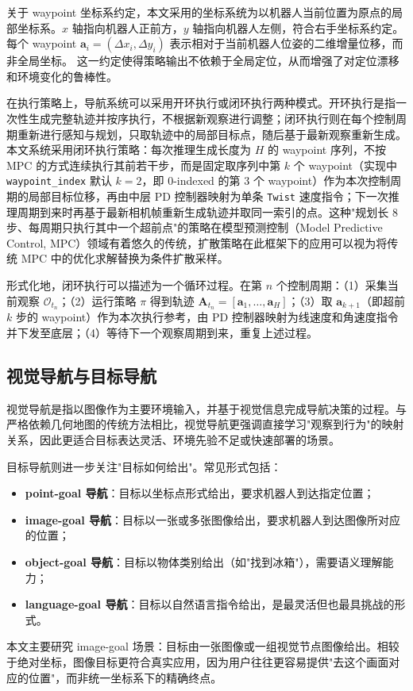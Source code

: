 关于 waypoint 坐标系约定，本文采用的坐标系统为以机器人当前位置为原点的局部坐标系。$x$ 轴指向机器人正前方，$y$ 轴指向机器人左侧，符合右手坐标系约定。每个 waypoint $\mathbf{a}_i = (\Delta x_i, \Delta y_i)$ 表示相对于当前机器人位姿的二维增量位移，而非全局坐标。
这一约定使得策略输出不依赖于全局定位，从而增强了对定位漂移和环境变化的鲁棒性。

在执行策略上，导航系统可以采用开环执行或闭环执行两种模式。开环执行是指一次性生成完整轨迹并按序执行，不根据新观察进行调整；闭环执行则在每个控制周期重新进行感知与规划，只取轨迹中的局部目标点，随后基于最新观察重新生成。本文系统采用闭环执行策略：每次推理生成长度为 $H$ 的 waypoint 序列，不按 MPC 的方式连续执行其前若干步，而是固定取序列中第 $k$ 个 waypoint（实现中 \texttt{waypoint\_index} 默认 $k=2$，即 0-indexed 的第 3 个 waypoint）作为本次控制周期的局部目标位移，再由中层 PD 控制器映射为单条 \texttt{Twist} 速度指令；下一次推理周期到来时再基于最新相机帧重新生成轨迹并取同一索引的点。这种"规划长 8 步、每周期只执行其中一个超前点"的策略在模型预测控制（Model Predictive Control, MPC）领域有着悠久的传统，扩散策略在此框架下的应用可以视为将传统 MPC 中的优化求解替换为条件扩散采样。

形式化地，闭环执行可以描述为一个循环过程。在第 $n$ 个控制周期：（1）采集当前观察 $\mathcal{O}_{t_n}$；（2）运行策略 $\pi$ 得到轨迹 $\mathbf{A}_{t_n} = [\mathbf{a}_1, \ldots, \mathbf{a}_H]$；（3）取 $\mathbf{a}_{k+1}$（即超前 $k$ 步的 waypoint）作为本次执行参考，由 PD 控制器映射为线速度和角速度指令并下发至底层；（4）等待下一个观察周期到来，重复上述过程。

\subsection{视觉导航与目标导航}

视觉导航是指以图像作为主要环境输入，并基于视觉信息完成导航决策的过程\cite{zhu2017targetdriven,anderson2018evaluation}。与严格依赖几何地图的传统方法相比，视觉导航更强调直接学习"观察到行为"的映射关系，因此更适合目标表达灵活、环境先验不足或快速部署的场景。

目标导航则进一步关注"目标如何给出"。常见形式包括：
\begin{itemize}
    \item \textbf{point-goal 导航}：目标以坐标点形式给出，要求机器人到达指定位置；
    \item \textbf{image-goal 导航}：目标以一张或多张图像给出，要求机器人到达图像所对应的位置；
    \item \textbf{object-goal 导航}：目标以物体类别给出（如"找到冰箱"），需要语义理解能力；
    \item \textbf{language-goal 导航}：目标以自然语言指令给出，是最灵活但也最具挑战的形式。
\end{itemize}
本文主要研究 image-goal 场景：目标由一张图像或一组视觉节点图像给出。相较于绝对坐标，图像目标更符合真实应用，因为用户往往更容易提供"去这个画面对应的位置"，而非统一坐标系下的精确终点。

